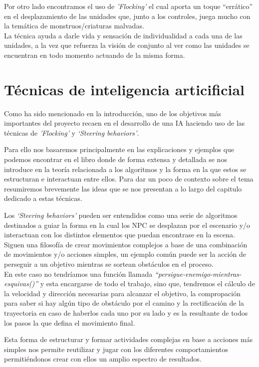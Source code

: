 Por otro lado encontramos el uso de \textit{'Flocking'} el cual aporta un toque ``errático''
en el desplazamiento de las unidades que, junto a los controles, juega mucho con la temática 
de monstruos/criaturas malvadas. \\
La técnica ayuda a darle vida y sensación de individualidad
a cada una de las unidades, a la vez que refuerza la visión de conjunto al ver como las
unidades se encuentran en todo momento actuando de la misma forma. 


\section{Técnicas de inteligencia articificial}
Como ha sido mencionado en la introducción, uno de los objetivos más importantes 
del proyecto recaen en el desarrollo de una \ac{IA} haciendo uso de las técnicas de 
\textit{'Flocking'} y \textit{`Steering behaviors'}.

Para ello nos basaremos principalmente en las explicaciones y ejemplos que podemos
encontrar en el libro \cite[ch.~3]{Millington2009} donde de forma extensa y detallada
se nos introduce en la teoría relacionada a los algoritmos y la forma en la que estos
se estructuran e interactuan entre ellos. Para dar un poco de contexto sobre el tema
resumiremos brevemente las ideas que se nos presentan a lo largo del capitulo dedicado
a estas técnicas. 

Los \textit{`Steering behaviors'} pueden ser entendidos como una serie de algoritmos
destinados a guiar la forma en la cual los \ac{NPC} se desplazan por el escenario
y/o interactuan con los distintos elementos que puedan encontrase en la escena. Siguen
una filosofía de crear movimientos complejos a base de una combinación de movimientos 
y/o acciones simples, un ejemplo común puede ser la acción de perseguir a un objetivo
mientras se sortean obstáculos en el proceso. \\ 
En este caso no tendríamos una función llamada 
\textit{``persigue-enemigo-mientras-esquivas()''} y esta encargarse de todo el 
trabajo, sino que, tendremos el cálculo de la velocidad y dirección necesarias para
alcanzar el objetivo, la compropación para saber si hay algún tipo de
obstáculo por el camino y la rectificación de la trayectoria en caso de
haberlos cada uno por su lado y es la resultante de todos los pasos la que defina el
movimiento final.

Esta forma de estructurar y formar actividades complejas en base a acciones más simples
nos permite reutilizar y jugar con los diferentes comportamientos permitiéndonos crear
con ellos un amplio espectro de resultados.

